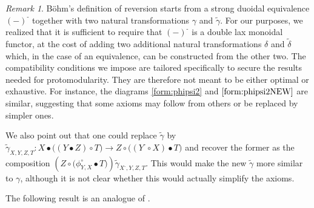 \documentclass[nosumlimits,twoside]{amsart}
\theoremstyle{definition}
\theoremstyle{remark}
\newtheorem{remark}[remark]{\sc Remark}
\def\revsn{\text{-}}
\newcommand{\rd}[1]{{\color{red}{#1}}}
\begin{document}
\begin{remark}%
B\"ohm's definition of reversion starts from a strong duoidal equivalence $(-)^\revsn$ together with two natural transformations $\gamma$ and $\widetilde{\gamma}$.
For our purposes, we realized that it is sufficient to require that $(-)^\revsn$ is a double lax monoidal functor, at the cost of adding two additional natural transformations $\delta$ and $\widetilde{\delta}$ which, in the case of an equivalence, can be constructed from the other two.
The compatibility conditions we impose are tailored specifically to secure the results needed for protomodularity. They are therefore not meant to be either optimal or exhaustive. For instance, the diagrams \eqref{form:phipsi2} and $\eqref{form:phipsi2NEW}$ are similar, suggesting that some axioms may follow from others or be replaced by simpler ones.

We also point out that one could replace $\widetilde{\gamma}$ by 
$\widetilde{\gamma}_{X,Y,Z,T}:
X \bullet \bigl((Y \bullet Z) \circ T\bigr)
  \to Z \circ \bigl((Y^{\revsn} \circ X) \bullet T\bigr)$ and recover the former as the composition $(Z \circ \bigl(\phi^\circ_{Y,X} \bullet T\bigr))\widetilde{\gamma}_{X^\revsn,Y,Z,T}$. This would make the new $\widetilde{\gamma}$ more similar to $\gamma$, although it is not clear whether this would actually simplify the axioms.
\end{remark}

The following result is an analogue of \cite[Lemma 4.2]{Bohm-Lack}.
\end{document}
